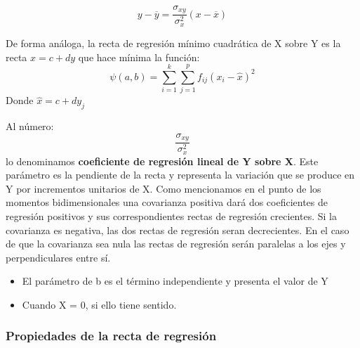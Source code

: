 \documentclass{article}
\theoremstyle{definition}
\begin{document}
	$$ y - \overline{y} = \frac{\sigma_{xy}}{\sigma_x^2} (x - \overline{x}) $$

	De forma análoga, la recta de regresión mínimo cuadrática de X sobre Y es la
	recta $x = c +dy$ que hace mínima la función: $$\psi (a,b) = \sum_{i=1}^k
	\sum_{j=1}^p f_{ij} {(x_i - \hat{x})}^2 $$ Donde $\hat{x} = c +dy_j $

	\vspace{2mm}

	Al número: $$\frac{\sigma_{xy}}{\sigma_x^2}$$ lo denominamos
	\textbf{coeficiente de regresión lineal de Y sobre X}. Este parámetro es la
	pendiente de la recta y representa la variación que se produce en Y por
	incrementos unitarios de X. Como mencionamos en el punto de los momentos
	bidimensionales una covarianza positiva dará dos coeficientes de regresión
	positivos y sus correspondientes rectas de regresión crecientes. Si la
	covarianza es negativa, las dos rectas de regresión seran decrecientes. En el
	caso de que la covarianza sea nula las rectas de regresión serán paralelas a
	los ejes y perpendiculares entre sí.

	\begin{itemize}
	\item El parámetro de b es el término independiente y presenta el valor de Y
	\item Cuando X = 0, si ello tiene sentido.
	\end{itemize}

	\subsubsection{Propiedades de la recta de regresión}
\end{document}
